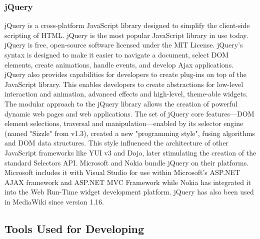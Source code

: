 \subsubsection{jQuery}
jQuery is a cross-platform JavaScript library designed to simplify the client-side scripting of HTML. jQuery is the most popular JavaScript library in use today. jQuery is free, open-source software licensed under the MIT License.
jQuery's syntax is designed to make it easier to navigate a document, select DOM elements, create animations, handle events, and develop Ajax applications. jQuery also provides capabilities for developers to create plug-ins on top of the JavaScript library. This enables developers to create abstractions for low-level interaction and animation, advanced effects and high-level, theme-able widgets. The modular approach to the jQuery library allows the creation of powerful dynamic web pages and web applications.
The set of jQuery core features—DOM element selections, traversal and manipulation—enabled by its selector engine (named "Sizzle" from v1.3), created a new "programming style", fusing algorithms and DOM data structures. This style influenced the architecture of other JavaScript frameworks like YUI v3 and Dojo, later stimulating the creation of the standard Selectors API.
Microsoft and Nokia bundle jQuery on their platforms. Microsoft includes it with Visual Studio for use within Microsoft's ASP.NET AJAX framework and ASP.NET MVC Framework while Nokia has integrated it into the Web Run-Time widget development platform. jQuery has also been used in MediaWiki since version 1.16.\cite{24}
\subsection{Tools Used for Developing}
